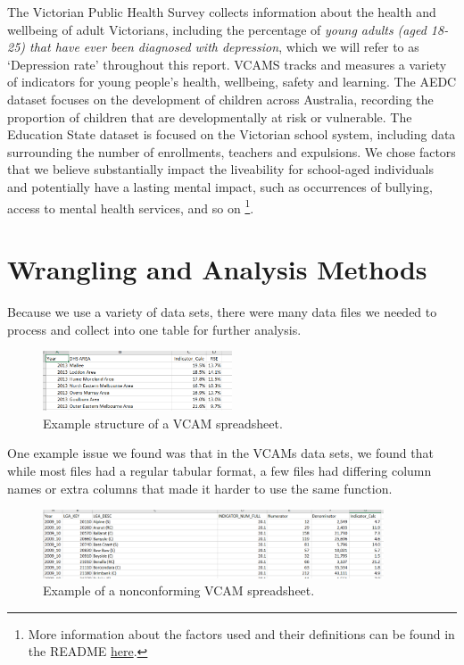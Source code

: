 \documentclass[a4, 11pt]{article}
\begin{document}
The Victorian Public Health Survey collects information about the health and wellbeing of adult Victorians, including the percentage of \emph{young adults (aged 18-25) that have ever been diagnosed with depression}, which we will refer to as `Depression rate' throughout this report. VCAMS tracks and measures a variety of indicators for young people’s health, wellbeing, safety and learning. The AEDC dataset focuses on the development of children across Australia, recording the proportion of children that are developmentally at risk or vulnerable. The Education State dataset is focused on the Victorian school system, including data surrounding the number of enrollments, teachers and expulsions. We chose factors that we believe substantially impact the liveability for school-aged individuals and potentially have a lasting mental impact, such as occurrences of bullying, access to mental health services, and so on \footnote{More information about the factors used and their definitions can be found in the README  \href{https://github.com/COMP20008/assignment-2-team55}{here}.}.  

\section{Wrangling and Analysis Methods}
Because we use a variety of data sets, there were many data files we needed to process and collect into one table for further analysis.

\begin{figure}[h]
    \centering
    \includegraphics[width=0.5\textwidth]{./plots/conforming.png}
    \caption{Example structure of a VCAM spreadsheet.}
    \label{fig:my_label}
\end{figure}

One example issue we found was that in the VCAMs data sets, we found that while most files had a regular tabular format, a few files had differing column names or extra columns that made it harder to use the same function. 

\begin{figure}[h]
    \centering
    \includegraphics[width=0.9\textwidth]{./plots/nonconforming.png}
    \caption{Example of a nonconforming VCAM spreadsheet.}
    \label{fig:my_label}
\end{figure}
\end{document}
